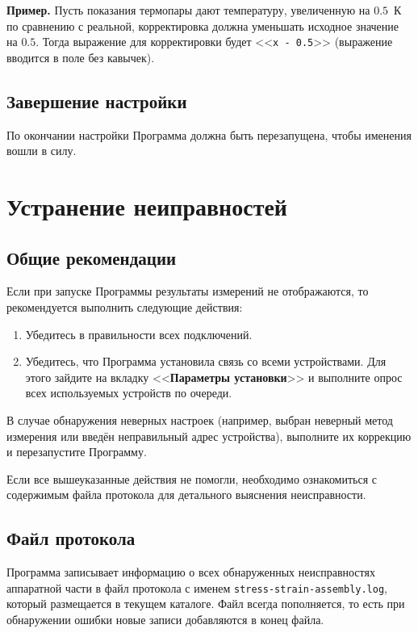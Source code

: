 \documentclass[12pt, a4paper, twocolumn]{report}
\newcommand{\PROGNAME}{stress-strain-assembly}
\newcommand{\CTL}[1]{<<{\bf #1}>>}
\newcommand{\CMD}[1]{<<{\tt #1}>>}
\newcommand{\FILENAME}[1]{{\tt #1}}
\begin{document}
{\bf Пример. } Пусть показания термопары дают температуру, увеличенную на $0.5$~К по сравнению с реальной, корректировка должна уменьшать исходное значение на $0.5$. Тогда выражение для корректировки будет \mbox{\CMD{x - 0.5}} (выражение вводится в поле без кавычек).

\section{Завершение настройки}

По окончании настройки Программа должна быть перезапущена, чтобы именения вошли в силу.

\chapter{Устранение неиправностей}

\section{Общие рекомендации}

Если при запуске Программы результаты измерений не отображаются, то рекомендуется выполнить следующие действия:

\begin{enumerate}
\item Убедитесь в правильности всех подключений.
\item Убедитесь, что Программа установила связь со всеми устройствами. Для этого зайдите на вкладку \CTL{Параметры установки} и выполните опрос всех используемых устройств по очереди.
\end{enumerate}

В случае обнаружения неверных настроек (например, выбран неверный метод измерения или введён неправильный адрес устройства), выполните их коррекцию и перезапустите Программу.

Если все вышеуказанные действия не помогли, необходимо ознакомиться с содержимым файла протокола для детального выяснения неисправности.

\section{Файл протокола}

Программа записывает информацию о всех обнаруженных неисправностях аппаратной части в файл протокола с именем \FILENAME{\PROGNAME{}.log}, который размещается в текущем каталоге. Файл всегда пополняется, то есть при обнаружении ошибки новые записи добавляются в конец файла.
\end{document}
